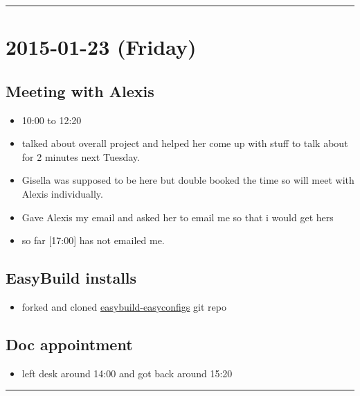 \documentclass[letterpaper]{scrartcl}
\begin{document}
\begin{center}\rule{0.5\linewidth}{\linethickness}\end{center}

\section{2015-01-23 (Friday)}\label{friday-3}

\subsection{Meeting with Alexis}\label{meeting-with-alexis}

\begin{itemize}
\itemsep1pt\parskip0pt
\item
  10:00 to 12:20
\item
  talked about overall project and helped her come up with stuff to talk
  about for 2 minutes next Tuesday.
\item
  Gisella was supposed to be here but double booked the time so will
  meet with Alexis individually.
\item
  Gave Alexis my email and asked her to email me so that i would get
  hers
\item
  so far {[}17:00{]} has not emailed me.
\end{itemize}

\subsection{EasyBuild installs}\label{easybuild-installs-2}

\begin{itemize}
\itemsep1pt\parskip0pt
\item
  forked and cloned
  \href{https://github.com/xguse/easybuild-easyconfigs}{easybuild-easyconfigs}
  git repo
\end{itemize}

\subsection{Doc appointment}\label{doc-appointment}

\begin{itemize}
\itemsep1pt\parskip0pt
\item
  left desk around 14:00 and got back around 15:20
\end{itemize}

\begin{center}\rule{0.5\linewidth}{\linethickness}\end{center}
\end{document}
